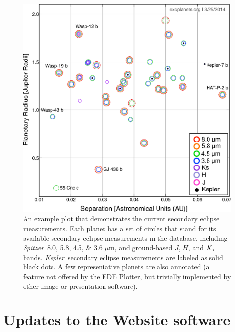 \documentclass[11pt,preprint]{aastex}
\def\micron{$\mu$m}
\def\kepler{\textit{Kepler}}
\def\spitzer{\textit{Spitzer}}
\def\micron{$\mu$m}
\begin{document}
\begin{CJK*}{UTF8}{gbsn}
\begin{figure}[!htb]
\centering
\includegraphics[width=\textwidth]{../fig/senew.eps}
\caption{An example plot that demonstrates the current secondary
  eclipse measurements. Each planet has a set of circles that stand
  for its available secondary eclipse measurements in the database,
  including \spitzer\ 8.0, 5.8, 4.5, \& 3.6 \micron, and ground-based
  $J$, $H$, and $K_{\rm s}$ bands. \kepler\ secondary eclipse measurements
  are labeled as solid black dots. A few representative planets are
  also annotated (a feature not offered by the EDE Plotter, but
  trivially implemented by other image or presentation software).}
\label{fig:se}
\end{figure}


\section{Updates to the Website software}\label{sec:website}


\end{CJK*}
\end{document}
